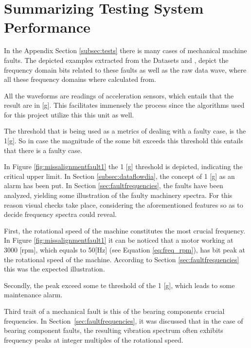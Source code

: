 \section{Summarizing Testing System Performance}
{
	In the Appendix Section \ref{subsec:tests} there is many cases of mechanical machine faults. The depicted examples extracted from the Datasets \cite{ihsannur} and \cite{hong2023hust}, depict the frequency domain bits related to these faults as well as the raw data wave, where all these frequency domains where calculated from.
	
	All the waveforms are readings of acceleration sensors, which entails that the result are in [g]. This facilitates immensely the process since the algorithms used for this project utilize this this unit as well.
	
	The threshold that is being used as a metrics of dealing with a faulty case, is the 1[g]. So in case the magnitude of the some bit exceeds this threshold this entails that there is a faulty case. 
	
	In Figure \ref{fig:missalignmentfault1} the 1 [g] threshold is depicted, indicating the critical upper limit. In Section \ref{subsec:dataflowdia}, the concept of 1 [g] as an alarm has been put. In Section \ref{sec:faultfrequencies}, the faults have been analyzed, yielding some illustration of the faulty machinery spectra. For this reason visual checks take place, considering the aforementioned features so as to decide frequency spectra could reveal. 
	
	First, the rotational speed of the machine constitutes the most crucial frequency. In Figure \ref{fig:missalignmentfault1} it can be noticed that a motor working at 3000 [rpm], which equals to 50[Hz] (see Equation \ref{eq:freq_rpm}), has bit peak at the rotational speed of the machine. According to Section \ref{sec:faultfrequencies} this was the expected illustration.
	
	Secondly, the peak exceed some te threshold of the 1 [g], which leads to some maintenance alarm. 
	
	Third trait of a mechanical fault is this of the bearing components crucial frequencies. In Section~\ref{sec:faultfrequencies}, it was discussed that in the case of bearing component faults, the resulting vibration spectrum often exhibits frequency peaks at integer multiples of the rotational speed. 
	
}

